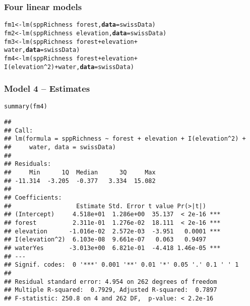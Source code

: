 \documentclass[color=usenames,dvipsnames]{beamer}\usepackage[]{graphicx}\usepackage[]{color}
\makeatletter
\newcommand{\hlnum}[1]{\textcolor[rgb]{0.69,0.494,0}{#1}}%
\newcommand{\hlopt}[1]{\textcolor[rgb]{0,0,0}{#1}}%
\newcommand{\hlstd}[1]{\textcolor[rgb]{0,0,0}{#1}}%
\newcommand{\hlkwb}[1]{\textcolor[rgb]{0,0.341,0.682}{#1}}%
\newcommand{\hlkwc}[1]{\textcolor[rgb]{0,0,0}{\textbf{#1}}}%
\newcommand{\hlkwd}[1]{\textcolor[rgb]{0.004,0.004,0.506}{#1}}%
\newenvironment{kframe}{%
 \def\at@end@of@kframe{}%
 \ifinner\ifhmode%
  \def\at@end@of@kframe{\end{minipage}}%
  \begin{minipage}{\columnwidth}%
 \fi\fi%
 \def\FrameCommand##1{\hskip\@totalleftmargin \hskip-\fboxsep
 \colorbox{shadecolor}{##1}\hskip-\fboxsep
     \hskip-\linewidth \hskip-\@totalleftmargin \hskip\columnwidth}%
 \MakeFramed {\advance\hsize-\width
   \@totalleftmargin\z@ \linewidth\hsize
   \@setminipage}}%
 {\par\unskip\endMakeFramed%
 \at@end@of@kframe}
\newenvironment{knitrout}{}{} %
\makeatother
\begin{document}
\begin{frame}[fragile]
  \frametitle{Four linear models}
\begin{knitrout}
\color{fgcolor}\begin{kframe}
\begin{alltt}
\hlstd{fm1} \hlkwb{<-} \hlkwd{lm}\hlstd{(sppRichness} \hlopt{~} \hlstd{forest,} \hlkwc{data}\hlstd{=swissData)}
\hlstd{fm2} \hlkwb{<-} \hlkwd{lm}\hlstd{(sppRichness} \hlopt{~} \hlstd{elevation,} \hlkwc{data}\hlstd{=swissData)}
\hlstd{fm3} \hlkwb{<-} \hlkwd{lm}\hlstd{(sppRichness} \hlopt{~} \hlstd{forest} \hlopt{+} \hlstd{elevation} \hlopt{+}
          \hlstd{water,} \hlkwc{data}\hlstd{=swissData)}
\hlstd{fm4} \hlkwb{<-} \hlkwd{lm}\hlstd{(sppRichness} \hlopt{~} \hlstd{forest} \hlopt{+} \hlstd{elevation} \hlopt{+}
          \hlkwd{I}\hlstd{(elevation}\hlopt{^}\hlnum{2}\hlstd{)} \hlopt{+} \hlstd{water,} \hlkwc{data}\hlstd{=swissData)}
\end{alltt}
\end{kframe}
\end{knitrout}
\end{frame}



\begin{frame}[fragile]
  \frametitle{Model 4 -- Estimates}
\begin{knitrout}\scriptsize
{}\color{fgcolor}\begin{kframe}
\begin{alltt}
\hlkwd{summary}\hlstd{(fm4)}
\end{alltt}
\begin{verbatim}
## 
## Call:
## lm(formula = sppRichness ~ forest + elevation + I(elevation^2) + 
##     water, data = swissData)
## 
## Residuals:
##     Min      1Q  Median      3Q     Max 
## -11.314  -3.205  -0.377   3.334  15.082 
## 
## Coefficients:
##                  Estimate Std. Error t value Pr(>|t|)    
## (Intercept)     4.518e+01  1.286e+00  35.137  < 2e-16 ***
## forest          2.311e-01  1.276e-02  18.111  < 2e-16 ***
## elevation      -1.016e-02  2.572e-03  -3.951   0.0001 ***
## I(elevation^2)  6.103e-08  9.661e-07   0.063   0.9497    
## waterYes       -3.013e+00  6.821e-01  -4.418 1.46e-05 ***
## ---
## Signif. codes:  0 '***' 0.001 '**' 0.01 '*' 0.05 '.' 0.1 ' ' 1
## 
## Residual standard error: 4.954 on 262 degrees of freedom
## Multiple R-squared:  0.7929,	Adjusted R-squared:  0.7897 
## F-statistic: 250.8 on 4 and 262 DF,  p-value: < 2.2e-16
\end{verbatim}
\end{kframe}
\end{knitrout}
\end{frame}
\end{document}
